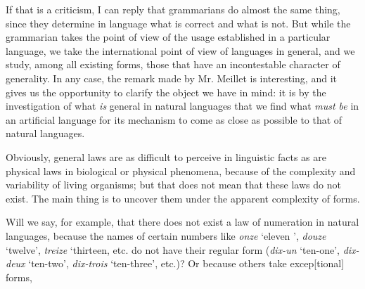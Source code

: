 {  If that is a criticism, I can reply that grammarians do almost the
  same thing, since they determine in language what is correct and
  what is not. But while the grammarian takes the point of view of the
  usage established in a particular language, we take the
  international point of view of languages in general, and we study,
  among all existing forms, those that have an incontestable character
  of generality.  In any case, the remark made by Mr. Meillet is
  interesting, and it gives us the opportunity to clarify the object
  we have in mind: it is by the investigation of what \emph{is}
  general in natural languages that we find what \emph{must be} in an
  artificial language for its mechanism to come as close as possible
  to that of natural languages.

  Obviously, general laws are as difficult to perceive in linguistic
  facts as are physical laws in biological or physical phenomena,
  because of the complexity and variability of living organisms; but
  that does not mean that these laws do not exist. The main thing is
  to uncover them under the apparent complexity of forms.

  Will we say, for example, that there does not exist a law of
  numeration in natural languages, because the names of certain
  numbers like \emph{onze} `eleven ', \emph{douze} `twelve',
  \emph{treize} `thirteen, etc. do not have their regular form
  (\emph{dix-un} `ten-one', \emph{dix-deux} `ten-two',
  \emph{dix-trois} `ten-three', etc.)?  Or because others take
  excep{[tional]} forms,
  }

